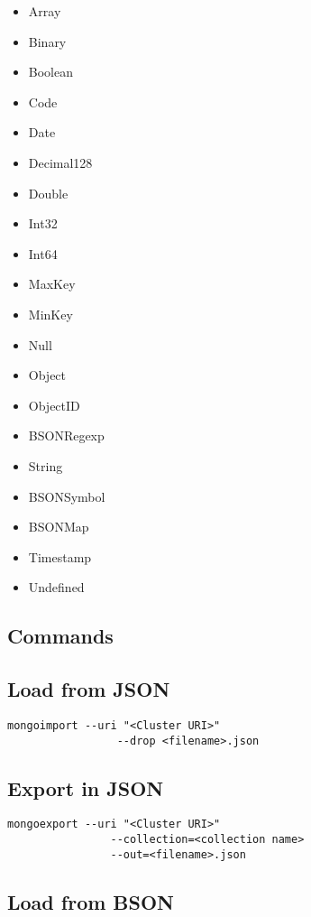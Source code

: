 \documentclass{article}
\begin{document}
\begin{itemize}
    \item Array
    \item Binary
    \item Boolean
    \item Code
    \item Date
    \item Decimal128
    \item Double
    \item Int32
    \item Int64
    \item MaxKey
    \item MinKey
    \item Null
    \item Object
    \item ObjectID
    \item BSONRegexp
    \item String
    \item BSONSymbol
    \item BSONMap
    \item Timestamp
    \item Undefined
\end{itemize}

\pagebreak

\subsection{Commands}

\subsection{Load from JSON}

\begin{lstlisting}[style=js]
    mongoimport --uri "<Cluster URI>"
                 --drop <filename>.json
\end{lstlisting}

\subsection{Export in JSON}

\begin{lstlisting}[style=js]
    mongoexport --uri "<Cluster URI>"
                --collection=<collection name>
                --out=<filename>.json
\end{lstlisting}

\subsection{Load from BSON}
\end{document}
